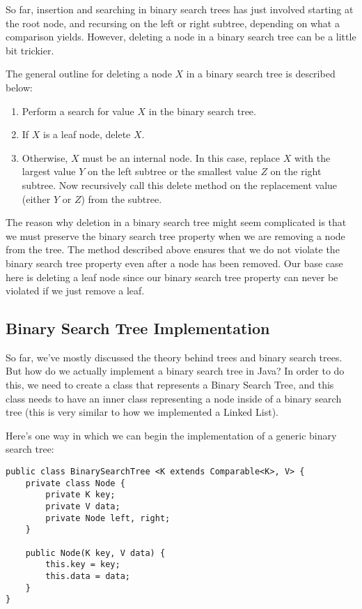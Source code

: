 So far, insertion and searching in binary search trees has just involved starting at the root node, and recursing on the left or right subtree, depending on what a comparison yields. However, deleting a node in a binary search tree can be a little bit trickier. 


The general outline for deleting a node $X$ in a binary search tree is described below:
\begin{enumerate}
    \item Perform a search for value $X$ in the binary search tree.
    \item If $X$ is a leaf node, delete $X$.
    \item Otherwise, $X$ must be an internal node. In this case, replace $X$ with the largest value $Y$ on the left subtree or the smallest value $Z$ on the right subtree. Now recursively call this delete method on the replacement value (either $Y$ or $Z$) from the subtree.
\end{enumerate}

The reason why deletion in a binary search tree might seem complicated is that we must preserve the binary search tree property when we are removing a node from the tree. The method described above ensures that we do not violate the binary search tree property even after a node has been removed. Our base case here is deleting a leaf node since our binary search tree property can never be violated if we just remove a leaf. 

\subsection{Binary Search Tree Implementation}

So far, we've mostly discussed the theory behind trees and binary search trees. But how do we actually implement a binary search tree in Java? In order to do this, we need to create a class that represents a Binary Search Tree, and this class needs to have an inner class representing a node inside of a binary search tree (this is very similar to how we implemented a Linked List).

Here's one way in which we can begin the implementation of a generic binary search tree:

\begin{lstlisting}
public class BinarySearchTree <K extends Comparable<K>, V> {
    private class Node {
        private K key;
        private V data;
        private Node left, right;
    }
    
    public Node(K key, V data) {
        this.key = key;
        this.data = data;
    }
}
\end{lstlisting}

